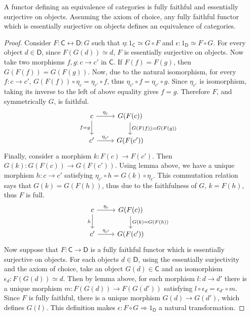 \begin{thm} A functor defining an equivalence of categories is fully faithful and essentially surjective on objects. Assuming the axiom of choice, any fully faithful functor which is essentially surjective on objects defines an equivalence of categories.
\end{thm}
\begin{proof}
Consider $F:\mathsf{C}\leftrightarrow \mathsf{D}:G$ such that $\eta:1_\mathsf{C}\simeq G\circ F$ and $\epsilon:1_\mathsf{D}\simeq F\circ G$. For every object $d\in \mathsf{D}$, since $F(G(d))\simeq d$, $F$ is essentially surjective on objects. Now take two morphisms $f,g:c\rightarrow c'$ in $\mathsf{C}$. If $F(f)=F(g)$, then $G(F(f))=G(F(g))$. Now, due to the natural isomorphism, for every $f:c\rightarrow c'$, $G(F(f))\circ \eta_c=\eta_{c'}\circ f$, thus $\eta_{c'}\circ f=\eta_{c'}\circ g$. Since $\eta_{c'}$ is isomorphism, taking its inverse to the left of above equality gives $f=g$. Therefore $F$, and symmetrically $G$, is faithful.
\begin{equation}
\begin{tikzcd}
c\arrow{r}{\eta_c} \arrow[swap]{d}{f=g} & G(F(c))\arrow{d}{G(F(f))=G(F(g))}\\
c'\arrow{r}{\eta_{c'}} & G(F(c'))
\end{tikzcd}
\end{equation}
Finally, consider a morphism $k:F(c)\rightarrow F(c')$. Then $G(k):G(F(c))\rightarrow G(F(c'))$. Using lemma above, we have a unique morphism $h:c\rightarrow c'$ satisfying $\eta_{c'}\circ h=G(k)\circ \eta_c$. This commutation relation says that $G(k)=G(F(h))$, thus due to the faithfulness of $G$, $k=F(h)$, thus $F$ is full.
\begin{equation}
\begin{tikzcd}
c\arrow{r}{\eta_c} \arrow[swap]{d}{h} & G(F(c))\arrow{d}{G(k)=G(F(h))}\\
c'\arrow{r}{\eta_{c'}} & G(F(c'))
\end{tikzcd}
\end{equation}
Now suppose that $F:\mathsf{C}\rightarrow \mathsf{D}$ is a fully faithful functor which is essentially surjective on objects. For each objects $d\in \mathsf{D}$, using the essentially surjectivity and the axiom of choice, take an object $G(d)\in \mathsf{C}$ and an isomorphism $\epsilon_d:F(G(d))\simeq d$. Then by lemma above, for each morphism $l:d\rightarrow d'$ there is a unique morphism $m:F(G(d))\rightarrow F(G(d'))$ satisfying $l\circ \epsilon_d=\epsilon_{d'}\circ m$. Since $F$ is fully faithful, there is a unique morphism $G(d)\rightarrow G(d')$, which defines $G(l)$. This definition makes $\epsilon:F\circ G\Rightarrow 1_\mathsf{D}$ a natural transformation.


\end{proof}
